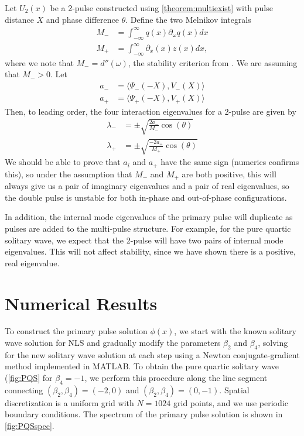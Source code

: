 \documentclass[12pt]{article}
\begin{document}
Let $U_2(x)$ be a 2-pulse constructed using \cref{theorem:multiexist} with pulse distance $X$ and phase difference $\theta$. Define the two Melnikov integrals
\begin{align*}
M_- &= \int_{-\infty}^\infty q(x) \partial_\omega q(x) dx \\
M_+ &= \int_{-\infty}^\infty \partial_x (x) z(x) dx,
\end{align*}
where we note that $M_- = d''(\omega)$, the stability criterion from \cite{Grillakis1987}. We are assuming that $M_- > 0$. Let 
\begin{align*}
a_- &= \langle \Psi_-(-X), V_-(X) \rangle \\
a_+ &= \langle \Psi_+(-X), V_+(X) \rangle 
\end{align*}
Then, to leading order, the four interaction eigenvalues for a 2-pulse are given by
\begin{equation}\label{inteigpred}
\begin{aligned}
\lambda_- &= \pm \sqrt{ \frac{2 a_-}{M_-} \cos(\theta) }\\
\lambda_+ &= \pm \sqrt{ \frac{-2 a_+}{M_+} \cos(\theta) }
\end{aligned}
\end{equation}
We should be able to prove that $a_i$ and $a_+$ have the same sign (numerics confirms this), so under the assumption that $M_-$ and $M_+$ are both positive, this will always give us a pair of imaginary eigenvalues and a pair of real eigenvalues, so the double pulse is unstable for both in-phase and out-of-phase configurations.

In addition, the internal mode eigenvalues of the primary pulse will duplicate as pulses are added to the multi-pulse structure. For example, for the pure quartic solitary wave, we expect that the 2-pulse will have two pairs of internal mode eigenvalues. This will not affect stability, since we have shown there is a positive, real eigenvalue.

\section{Numerical Results}

To construct the primary pulse solution $\phi(x)$, we start with the known solitary wave solution for NLS and gradually modify the parameters $\beta_2$ and $\beta_4$, solving for the new solitary wave solution at each step using a Newton conjugate-gradient method \cite[Chapter 7.2.4]{YangCh7} implemented in MATLAB. To obtain the pure quartic solitary wave (\cref{fig:PQS} for $\beta_4 = -1$, we perform this procedure along the line segment connecting $(\beta_2, \beta_4) = (-2, 0)$ and $(\beta_2, \beta_4) = (0, -1)$. Spatial discretization is a uniform grid with $N = 1024$ grid points, and we use periodic boundary conditions. The spectrum of the primary pulse solution is shown in \cref{fig:PQSspec}.
\end{document}

